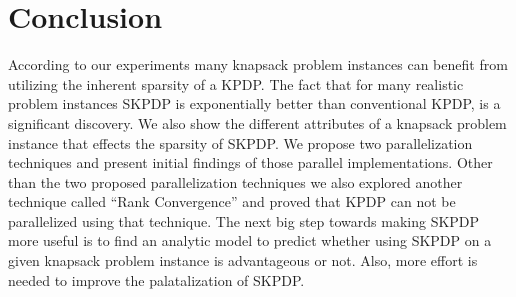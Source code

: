 \chapter{Conclusion}

\label{chap:conclusion}
According to our experiments many knapsack problem instances can benefit from utilizing the inherent sparsity of a KPDP. The fact that for many realistic problem instances SKPDP is exponentially better than conventional KPDP, is a significant discovery. We also show the different attributes of a knapsack problem instance that effects the sparsity of SKPDP. We propose two parallelization techniques and present initial findings of those parallel implementations. Other than the two proposed parallelization techniques we also explored another technique called ``Rank Convergence'' and proved that KPDP can not be parallelized using that technique. The next big step towards making SKPDP more useful is to find an analytic model to predict whether using SKPDP on a given knapsack problem instance is advantageous or not. Also, more effort is needed to improve the palatalization of SKPDP.





